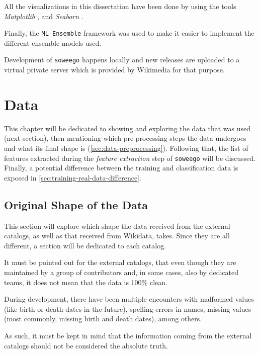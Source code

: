 \documentclass[epsfig,a4paper,11pt,titlepage,twoside,openany]{book}
\begin{document}
All the visualizations in this dissertation have been done by using the tools \textit{Matplotlib} \cite{Hunter_Matplotlib}, and \textit{Seaborn} \cite{Seaborn}.%

Finally, the \texttt{ML-Ensemble} \cite{flennerhag:2017mlens} framework was used to make it easier to implement the different ensemble models used.


Development of \texttt{soweego} happens locally and new releases are uploaded to a virtual private server which is provided by Wikimedia for that purpose. 



\chapter{Data}
\label{chap:data}


This chapter will be dedicated to showing and exploring the data that was used (next section), then mentioning which pre-processing steps the data undergoes and what its final shape is (\autoref{sec:data-preprocessing}). Following that, the list of features extracted during the \textit{feature extraction} step of \texttt{soweego} will be discussed. Finally, a potential difference between the training and classification data is exposed in \autoref{sec:training-real-data-difference}.


\section{Original Shape of the Data}
\label{sec:orig-shape-of-data}

This section will explore which shape the data received from the external catalogs, as well as that received from Wikidata, takes. Since they are all different, a section will be dedicated to each catalog. 

It must be pointed out for the external catalogs, that even though they are maintained by a group of contributors and, in some cases, also by dedicated teams, it does not mean that the data is 100\% clean. 

During development, there have been multiple encounters with malformed values (like birth or death dates in the future), spelling errors in names, missing values (most commonly, missing birth and death dates), among others. 

As such, it must be kept in mind that the information coming from the external catalogs should not be considered the absolute truth.
\end{document}
